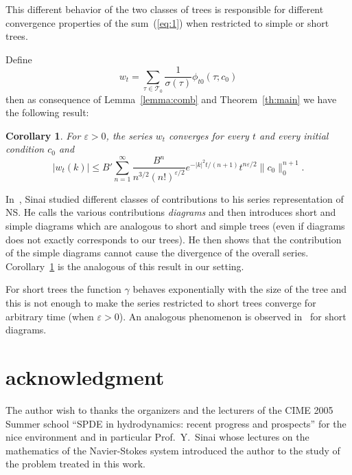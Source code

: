 \documentclass[a4paper,12pt,reqno]{amsart}
\newcommand{\1}{{\bf 1}}
\newcommand{\eps}{\varepsilon}
\newtheorem{corollary}[theorem]{Corollary}
\newcommand{\TT}{\mathcal{T}}
\begin{document}
This different behavior of the two classes of trees is responsible for
different convergence properties of the sum~(\ref{eq:1}) when
restricted to simple or short trees.

Define
$$
w_t = \sum_{\tau \in \TT_0} \frac{1}{\sigma(\tau)} \phi_{t0}(\tau; c_0)
$$
then as consequence of Lemma~\ref{lemma:comb} and Theorem~\ref{th:main} we have the following result: 

\begin{corollary}
\label{cor:exp-decay}
For $\eps > 0$,
the series $w_t$ converges for every $t$ and every initial condition
$c_0$ and
$$
|w_t(k)| \le B' \sum_{n=1}^\infty  \frac{B^n}{n^{3/2} (n!)^{\eps/2}} e^{-|k|^2 t / (n+1)}
t^{n \eps /2} \|c_0\|_0^{n+1}. 
$$
\end{corollary}

In~\cite{Sinai3}, Sinai studied different classes of contributions to
his series representation of NS. He calls the various contributions
\emph{diagrams} and then introduces short and simple diagrams which
are analogous to short and simple trees (even if diagrams does not
exactly corresponds to our trees). He then shows that the contribution
of the simple diagrams cannot cause the divergence of the overall
series. Corollary~\ref{cor:exp-decay} is the analogous of this result
in our setting.

For short trees the function $\gamma$ behaves exponentially with the
size of the tree and this is not enough to make the series restricted
to short trees converge for arbitrary time (when $\eps > 0$). 
An analogous phenomenon is observed in~\cite{Sinai3} for short
diagrams.




\section*{acknowledgment}
The author wish to thanks the organizers and the lecturers of the CIME 2005 Summer
school ``SPDE in hydrodynamics: recent progress and prospects'' for the nice environment
and in particular Prof.~Y.~Sinai whose lectures on the mathematics of
the Navier-Stokes system introduced the author to the study of
the problem treated in this work.    
\end{document}
